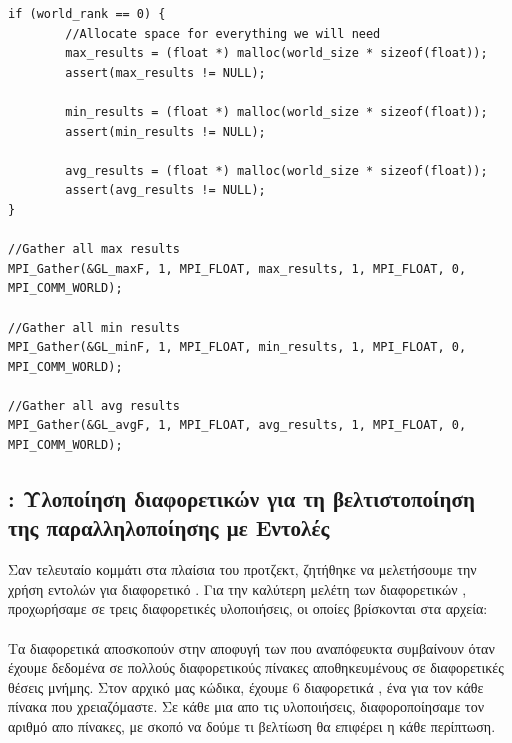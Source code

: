 \documentclass{article}
\begin{document}
\vspace{13mm}
\begin{lstlisting}
if (world_rank == 0) {
        //Allocate space for everything we will need
        max_results = (float *) malloc(world_size * sizeof(float));
        assert(max_results != NULL);

        min_results = (float *) malloc(world_size * sizeof(float));
        assert(min_results != NULL);

        avg_results = (float *) malloc(world_size * sizeof(float));
        assert(avg_results != NULL);
}

//Gather all max results
MPI_Gather(&GL_maxF, 1, MPI_FLOAT, max_results, 1, MPI_FLOAT, 0, MPI_COMM_WORLD);

//Gather all min results
MPI_Gather(&GL_minF, 1, MPI_FLOAT, min_results, 1, MPI_FLOAT, 0, MPI_COMM_WORLD);

//Gather all avg results
MPI_Gather(&GL_avgF, 1, MPI_FLOAT, avg_results, 1, MPI_FLOAT, 0, MPI_COMM_WORLD);
\end{lstlisting}


\newpage
\subsection{: Υλοποίηση διαφορετικών  για τη βελτιστοποίηση της παραλληλοποίησης με  Εντολές }

Σαν τελευταίο κομμάτι στα πλαίσια του προτζεκτ, ζητήθηκε να μελετήσουμε την χρήση εντολών  για διαφορετικό .  
Για την καλύτερη μελέτη των διαφορετικών , προχωρήσαμε σε τρεις διαφορετικές υλοποιήσεις, οι οποίες βρίσκονται στα αρχεία:\\
\\

Τα διαφορετικά  αποσκοπούν στην αποφυγή των  που αναπόφευκτα συμβαίνουν όταν έχουμε δεδομένα σε πολλούς διαφορετικούς πίνακες αποθηκευμένους σε διαφορετικές θέσεις μνήμης. Στον αρχικό μας κώδικα, έχουμε 6 διαφορετικά , ένα για τον κάθε πίνακα που χρειαζόμαστε. Σε κάθε μια απο τις υλοποιήσεις, διαφοροποίησαμε τον αριθμό απο πίνακες, με σκοπό να δούμε τι βελτίωση θα επιφέρει η κάθε περίπτωση.\\
\end{document}
